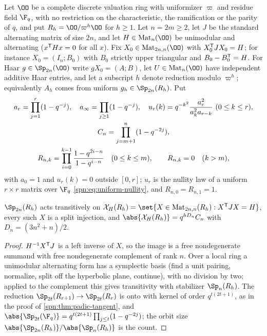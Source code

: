 Let $\OO$ be a complete discrete valuation ring with uniformizer $\varpi$ and residue field $\F_q$,
with no restriction on the characteristic, the ramification or the parity of $q$, and put
$R_h=\OO/\varpi^h\OO$ for $h\ge1$. Let $n=2m\ge2$, let $J$ be the standard alternating matrix of size
$2n$, and let $H\in\spnMat_n(\OO)$ be unimodular and alternating ($x^{\mathsf{T}}Hx=0$ for all $x$). Fix
$X_0\in\spnMat_{2n,n}(\OO)$ with $X_0^{\mathsf{T}}JX_0=H$; for instance $X_0=(I_n;B_0)$ with $B_0$ strictly upper
triangular and $B_0-B_0^{\mathsf{T}}=H$. For Haar $g\in\Sp_{2n}(\OO)$ write $gX_0=(A;B)$, let $U\in\spnMat_n(\OO)$
have independent additive Haar entries, and let a subscript $h$ denote reduction modulo $\varpi^h$;
equivalently $A_h$ comes from uniform $g_h\in\Sp_{2n}(R_h)$. Put
\begin{gather}
 a_r=\prod_{j=1}^r(1-q^{-j}),\quad a_\infty=\prod_{j\ge1}(1-q^{-j}),\quad
 u_r(k)=q^{-k^2}\frac{a_r^2}{a_k^2a_{r-k}}\ (0\le k\le r),\notag\\
 C_n=\prod_{j=m+1}^n(1-q^{-2j}),\notag\\
 R_{n,k}=\prod_{i=0}^{k-1}\frac{1-q^{2i-n}}{1-q^{i-n}}\quad(0\le k\le m),\qquad R_{n,k}=0\quad(k>m),
 \label{spn:eq:local-Rnk}
\end{gather}
with $a_0=1$ and $u_r(k)=0$ outside $[0,r]$; $u_r$ is the nullity law of a uniform $r\times r$ matrix
over $\F_q$ \eqref{spn:eq:uniform-nullity}, and $R_{n,0}=R_{n,1}=1$.

\begin{lemma}\label{spn:lem:local-frames}
$\Sp_{2n}(R_h)$ acts transitively on $\mathcal X_H(R_h)=\set{X\in\spnMat_{2n,n}(R_h):X^{\spnT}JX=H}$,
every such $X$ is a split injection, and $\abs{\mathcal X_H(R_h)}=q^{hD_n}C_n$ with $D_n=(3n^2+n)/2$.
\end{lemma}
\begin{proof}
$H^{-1}X^{\mathsf{T}}J$ is a left inverse of $X$, so the image is a free nondegenerate summand with free
nondegenerate complement of rank $n$. Over a local ring a unimodular alternating form has a
symplectic basis (find a unit pairing, normalize, split off the hyperbolic plane, continue), with no
division by two; applied to the complement this gives transitivity with stabilizer $\Sp_n(R_h)$. The
reduction $\Sp_{2t}(R_{r+1})\to\Sp_{2t}(R_r)$ is onto with kernel of order $q^{t(2t+1)}$, as in the
proof of \cref{spn:thm:padic-tangent}, and
$\abs{\Sp_{2t}(\F_q)}=q^{t(2t+1)}\prod_{j\le t}(1-q^{-2j})$; the orbit size
$\abs{\Sp_{2n}(R_h)}/\abs{\Sp_n(R_h)}$ is the count.
\end{proof}

